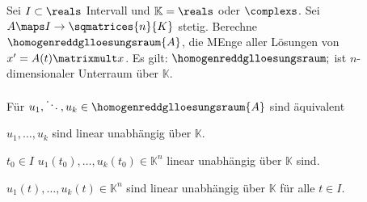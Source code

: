 \begin{satz}\label{homogene_dgl_loesungsraum}
  Sei \( I\subset \reals \) Intervall und \( \mathbb{K}=\reals \) oder \( \complexs \). Sei \( A\maps I\to \sqmatrices{n}{K} \) stetig. Berechne \( \homogenreddglloesungsraum{A} \), die MEnge aller Lösungen von \( x'=A(t)\matrixmult x \). Es gilt: \( \homogenreddglloesungsraum; \) ist \( n \)-dimensionaler Unterraum über \( \mathbb{K} \).

  Für \( u_1,\ddots,u_k\in \homogenreddglloesungsraum{A} \) sind äquivalent
  \begin{eigenschaftenenumerate}
    \item \label{homogene_dgl_loesungsraum:loesungen_unabhaengig}\( u_1,\dotsc,u_k \) sind linear unabhängig über \( \mathbb{K} \).
    \item \label{homogene_dgl_loesungsraum:loesungen_unabhaengig_fuer_einen_wert} \texists \( t_0\in I \) \sd \( u_1(t_0),\dotsc,u_k(t_0)\in \mathbb{K}^n \) linear unabhängig über \( \mathbb{K} \) sind.
    \item \label{homogene_dgl_loesungsraum:loesungen_unabhaengig_fuer_alle_werte}\( u_1(t),\dotsc,u_k(t)\in \mathbb{K}^n \) sind linear unabhängig über \( \mathbb{K} \) für alle \( t\in I \).
  \end{eigenschaftenenumerate}
\end{satz}
